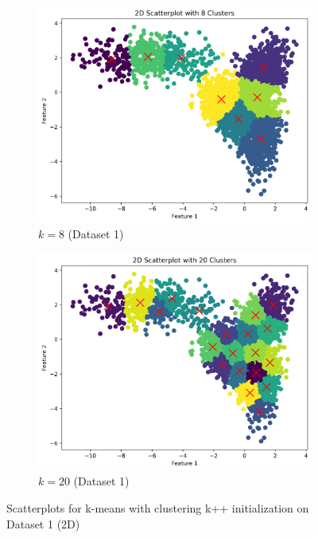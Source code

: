 \documentclass{article}
\begin{document}
\begin{figure}[h]
\begin{subfigure}[b]{0.45\textwidth}
        \includegraphics[width=\textwidth]{figures/2d_scatter_k8_d0.png}
        \caption{$k=8$ (Dataset 1)}
        \label{fig:2d_k8}
    \end{subfigure}
    \begin{subfigure}[b]{0.45\textwidth}
        \includegraphics[width=\textwidth]{figures/2d_scatter_k20_d0.png}
        \caption{$k=20$ (Dataset 1)}
        \label{fig:2d_k20}
    \end{subfigure}
    \caption{Scatterplots for k-means with clustering k++ initialization on Dataset 1 (2D)}
    \label{fig:2d_scatterplots}
\end{figure}
\end{document}
